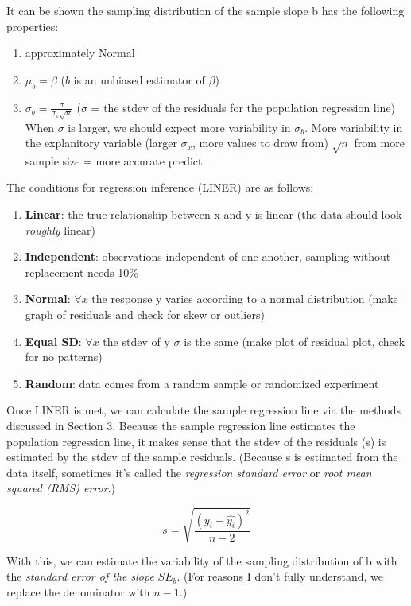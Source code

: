 \documentclass[12pt, a4paper]{article}
\theoremstyle{definition}
\begin{document}
It can be shown the sampling distribution of the sample slope b has the following properties:
\begin{enumerate}
    \item approximately Normal
    \item $\mu_b = \beta$ ($b$ is an unbiased estimator of $\beta$)
    \item $\sigma_b = \frac{\sigma}{\sigma_x \sqrt{n}}$ ($\sigma$ = the stdev of the residuals for the population regression line)
        \subitem When $\sigma$ is larger, we should expect more variability in $\sigma_b$.
        \subitem More variability in the explanitory variable (larger $\sigma_x$, more values to draw from)
        \subitem $\sqrt{n}$ from more sample size = more accurate predict.
\end{enumerate}

The conditions for regression inference (LINER) are as follows:
\begin{enumerate}
    \item \textbf{Linear}: the true relationship between x and y is linear (the data should look \textit{roughly} linear)
    \item \textbf{Independent}: observations independent of one another, sampling without replacement needs 10\%
    \item \textbf{Normal}: $\forall x$ the response y varies according to a normal distribution (make graph of residuals and check for skew or outliers)
    \item \textbf{Equal SD}: $\forall x$ the stdev of y $\sigma$ is the same (make plot of residual plot, check for no patterns)
    \item \textbf{Random}: data comes from a random sample or randomized experiment
\end{enumerate}

Once LINER is met, we can calculate the sample regression line via the methods discussed in Section 3.
Because the sample regression line estimates the population regression line, it makes sense that the stdev of the residuals (s) is estimated by the stdev of the sample residuals.
(Because s is estimated from the data itself, sometimes it's called the \textit{regression standard error} or \textit{root mean squared (RMS) error}.)

\[s = \sqrt{\frac{(y_i - \hat{y_i})^2}{n - 2}}\]

With this, we can estimate the variability of the sampling distribution of b with the \textit{standard error of the slope} $SE_b$.
(For reasons I don't fully understand, we replace the denominator with $n - 1$.)
\end{document}
